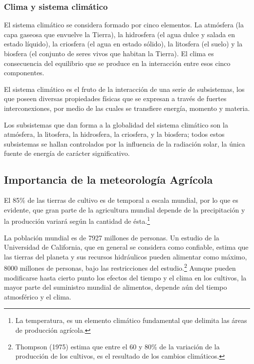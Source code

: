 \subsubsection{Clima y sistema climático}

El sistema climático se considera formado por cinco elementos. La atmósfera (la capa gaseosa que envuelve la Tierra), la hidrosfera (el agua dulce y salada en estado líquido), la criosfera (el agua en estado sólido), la litosfera (el suelo) y la biosfera (el conjunto de seres vivos que habitan la Tierra). El clima es consecuencia del equilibrio que se produce en la interacción entre esos cinco componentes.

El sistema climático es el fruto de la interacción de una serie de subsistemas, los que poseen diversas propiedades físicas que se expresan a través de fuertes interconexiones, por medio de las cuales se transfiere energía, momento y materia.

Los subsistemas que dan forma a la globalidad del sistema climático son la atmósfera, la litosfera, la hidrosfera, la criosfera, y la biosfera; todos estos subsistemas se hallan controlados por la influencia de la radiación solar, la única fuente de energía de carácter significativo.

\subsection{Importancia de la meteorología Agrícola}

El 85\% de las tierras de cultivo es de temporal a escala mundial, por lo que es evidente, que gran parte de la agricultura mundial depende de la precipitación y la producción variará según la cantidad de ésta.\footnote{La temperatura, es un elemento climático fundamental que delimita las áreas de producción agrícola.}

La población mundial es de 7927 millones de personas. Un estudio de la Universidad de California, que en general se considera como confiable, estima que las tierras del planeta y sus recursos hidráulicos pueden alimentar como máximo, 8000 millones de personas, bajo las restricciones del estudio.\footnote{Thompson (1975) estima que entre el 60 y 80\% de la variación de la producción de los cultivos, es el resultado de los cambios climáticos.}
Aunque pueden modificarse hasta cierto punto los efectos del tiempo y el clima en los cultivos, la mayor parte del suministro mundial de alimentos, depende aún del tiempo atmosférico y el clima.

